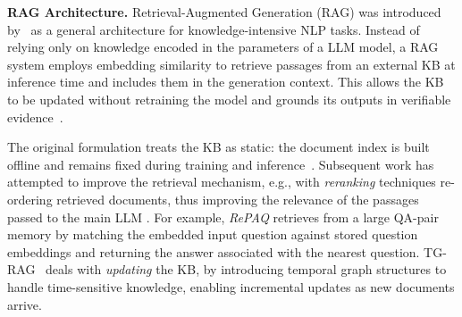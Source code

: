 \documentclass[a4paper,twoside]{article}
\begin{document}

\textbf{RAG Architecture.} Retrieval-Augmented Generation (RAG) was introduced by~\cite{lewis2020retrieval} as a general architecture for knowledge-intensive NLP tasks. Instead of relying only on knowledge encoded in the parameters of a LLM model, a RAG system employs embedding similarity to retrieve passages from an external KB at inference time and includes them in the generation context. This allows the KB to be updated without retraining the model and grounds its outputs in verifiable evidence~\cite{gao2023retrieval}.

The original formulation treats the KB as static: the document index is built offline and remains fixed during training and inference~\cite{lewis2020retrieval}. Subsequent work has attempted to improve the retrieval mechanism, e.g., with \textit{reranking} techniques re-ordering retrieved documents,
thus improving the relevance of the passages passed to the main LLM \cite{asai2024self,jiang2023active,yan2024corrective}. For example, \textit{RePAQ} \cite{lewis2021paq} retrieves from a large QA-pair memory by matching the embedded input question against stored question embeddings and returning the answer associated with the nearest question. TG-RAG~\cite{han2025rag} deals with \textit{updating} the KB, by introducing temporal graph structures to handle time-sensitive knowledge, enabling incremental updates as new documents arrive.
\end{document}
